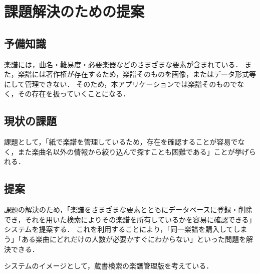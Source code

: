 \chapter{課題解決のための提案}\label{chap:課題解決のための提案}
\section*{予備知識}
楽譜には，曲名・難易度・必要楽器などのさまざまな要素が含まれている．
また，楽譜には著作権が存在するため，楽譜そのものを画像，またはデータ形式等にして管理できない．
そのため，本アプリケーションでは楽譜そのものでなく，その存在を扱っていくことになる．
\section*{現状の課題}
課題として，「紙で楽譜を管理しているため，存在を確認することが容易でなく，また楽曲名以外の情報から絞り込んで探すことも困難である」ことが挙げられる．
\section*{提案}
課題の解決のため，「楽譜をさまざまな要素とともにデータベースに登録・削除でき，それを用いた検索によりその楽譜を所有しているかを容易に確認できる」システムを提案する．
これを利用することにより，「同一楽譜を購入してしまう」「ある楽曲にどれだけの人数が必要かすぐにわからない」といった問題を解決できる．\par
システムのイメージとして，蔵書検索の楽譜管理版を考えている．